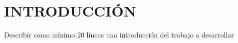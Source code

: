 \chapter*{INTRODUCCI\'ON}

Describir como mínimo 20 líneas una introducción del trabajo a desarrollar